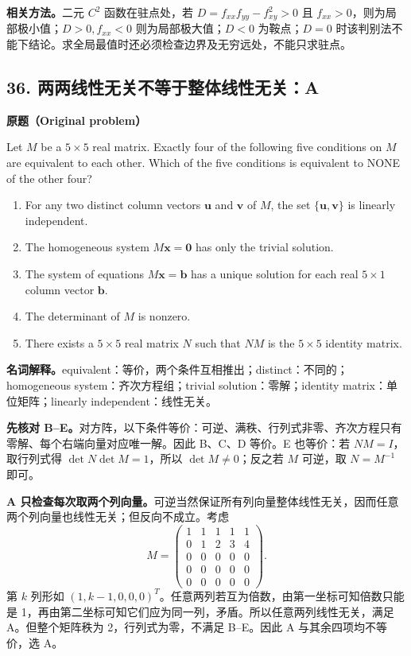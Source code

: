 \documentclass[11pt,a4paper,fontset=fandol]{ctexart}
\begin{document}
\textbf{相关方法。}二元 $C^2$ 函数在驻点处，若 $D=f_{xx}f_{yy}-f_{xy}^2>0$ 且 $f_{xx}>0$，则为局部极小值；$D>0,f_{xx}<0$ 则为局部极大值；$D<0$ 为鞍点；$D=0$ 时该判别法不能下结论。求全局最值时还必须检查边界及无穷远处，不能只求驻点。

\subsection{36. 两两线性无关不等于整体线性无关：A}
\label{p2:q36}
\textbf{原题（Original problem）}

Let $M$ be a $5\times5$ real matrix. Exactly four of the following five conditions on $M$ are equivalent to each other. Which of the five conditions is equivalent to NONE of the other four?
\begin{enumerate}[label=(\Alph*)]
\item For any two distinct column vectors $\mathbf u$ and $\mathbf v$ of $M$, the set $\{\mathbf u,\mathbf v\}$ is linearly independent.
\item The homogeneous system $M\mathbf x=\mathbf0$ has only the trivial solution.
\item The system of equations $M\mathbf x=\mathbf b$ has a unique solution for each real $5\times1$ column vector $\mathbf b$.
\item The determinant of $M$ is nonzero.
\item There exists a $5\times5$ real matrix $N$ such that $NM$ is the $5\times5$ identity matrix.
\end{enumerate}
\textbf{名词解释。}equivalent：等价，两个条件互相推出；distinct：不同的；homogeneous system：齐次方程组；trivial solution：零解；identity matrix：单位矩阵；linearly independent：线性无关。

\textbf{先核对 B--E。}对方阵，以下条件等价：可逆、满秩、行列式非零、齐次方程只有零解、每个右端向量对应唯一解。因此 B、C、D 等价。E 也等价：若 $NM=I$，取行列式得 $\det N\det M=1$，所以 $\det M\ne0$；反之若 $M$ 可逆，取 $N=M^{-1}$ 即可。

\textbf{A 只检查每次取两个列向量。}可逆当然保证所有列向量整体线性无关，因而任意两个列向量也线性无关；但反向不成立。考虑
\[
M=\begin{pmatrix}
1&1&1&1&1\\
0&1&2&3&4\\
0&0&0&0&0\\
0&0&0&0&0\\
0&0&0&0&0
\end{pmatrix}.
\]
第 $k$ 列形如 $(1,k-1,0,0,0)^T$。任意两列若互为倍数，由第一坐标可知倍数只能是 1，再由第二坐标可知它们应为同一列，矛盾。所以任意两列线性无关，满足 A。但整个矩阵秩为 2，行列式为零，不满足 B--E。因此 A 与其余四项均不等价，选 A。
\end{document}
